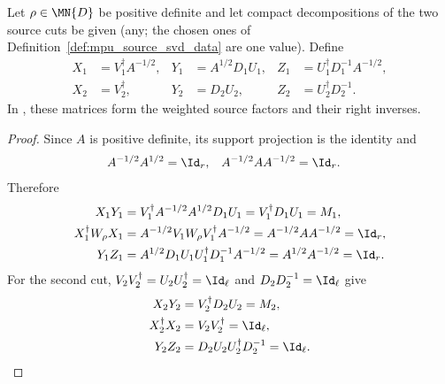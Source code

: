 \begin{definition}
    \label{def:mpu_weighted_source_factors}
    \leanok
    Let $\rho\in\MN{D}$ be positive definite and let compact decompositions of
    the two source cuts be given (any; the chosen ones of
    Definition~\ref{def:mpu_source_svd_data} are one value). Define
    \begin{align}
        X_1 & =V_1^\dagger A^{-1/2},
            & Y_1                    & =A^{1/2}D_1U_1,
            & Z_1                    & =U_1^\dagger D_1^{-1}A^{-1/2}, \\
        X_2 & =V_2^\dagger,
            & Y_2                    & =D_2U_2,
            & Z_2                    & =U_2^\dagger D_2^{-1}.
    \end{align}
    In \cite[Section~III]{Cirac2017MPU}, these matrices form the weighted source factors and their right inverses.
\end{definition}

\begin{proof}
    \leanok
    Since $A$ is positive definite, its support projection is the identity and
    \begin{align}
        A^{-1/2}A^{1/2} & =\Id_r,
                        & A^{-1/2}AA^{-1/2} & =\Id_r.
    \end{align}
    Therefore
    \begin{align}
        X_1Y_1
         & =V_1^\dagger A^{-1/2}A^{1/2}D_1U_1
        =V_1^\dagger D_1U_1=M_1,                      \\
        X_1^\dagger W_\rho X_1
         & =A^{-1/2}V_1W_\rho V_1^\dagger A^{-1/2}
        =A^{-1/2}AA^{-1/2}=\Id_r,                     \\
        Y_1Z_1
         & =A^{1/2}D_1U_1U_1^\dagger D_1^{-1}A^{-1/2}
        =A^{1/2}A^{-1/2}=\Id_r.
    \end{align}
    For the second cut, $V_2V_2^\dagger=U_2U_2^\dagger=\Id_\ell$ and
    $D_2D_2^{-1}=\Id_\ell$ give
    \begin{align}
        X_2Y_2          & =V_2^\dagger D_2U_2=M_2,              \\
        X_2^\dagger X_2 & =V_2V_2^\dagger=\Id_\ell,             \\
        Y_2Z_2          & =D_2U_2U_2^\dagger D_2^{-1}=\Id_\ell.
    \end{align}
\end{proof}

